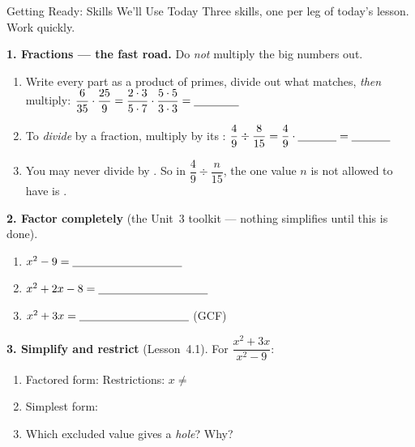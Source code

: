 \documentclass[10pt]{article}
\begin{document}
\namedateperiod

\vspace{0.10in}

\begin{notesbox}{Getting Ready: Skills We'll Use Today}
\small Three skills, one per leg of today's lesson. Work quickly.

\vspace{4pt}
\textbf{1. Fractions --- the fast road.} Do \emph{not} multiply the big numbers out.
\begin{enumerate}[label=(\alph*), leftmargin=2.1em, itemsep=3pt]
  \item Write every part as a product of primes, divide out what matches, \emph{then} multiply:
        $\dfrac{6}{35}\cdot\dfrac{25}{9}=\dfrac{2\cdot3}{5\cdot7}\cdot\dfrac{5\cdot5}{3\cdot3}
        =\blank{1.4cm}$
  \item To \emph{divide} by a fraction, multiply by its \blank{2.4cm}:
        $\dfrac{4}{9}\div\dfrac{8}{15}=\dfrac{4}{9}\cdot\blank{1.2cm}=\blank{1.2cm}$
  \item You may never divide by \blank{1.2cm}. So in $\dfrac{4}{9}\div\dfrac{n}{15}$, the one value
        $n$ is not allowed to have is \blank{1.0cm}.
\end{enumerate}

\vspace{4pt}
\textbf{2. Factor completely} (the Unit~3 toolkit --- nothing simplifies until this is done).
\begin{enumerate}[label=(\alph*), leftmargin=2.1em, itemsep=3pt]
  \item $x^2-9=\blank{3.4cm}$
  \item $x^2+2x-8=\blank{3.4cm}$
  \item $x^2+3x=\blank{3.4cm}$ \quad (GCF)
\end{enumerate}

\vspace{4pt}
\textbf{3. Simplify and restrict} (Lesson~4.1). For $\dfrac{x^2+3x}{x^2-9}$:
\begin{enumerate}[label=(\alph*), leftmargin=2.1em, itemsep=3pt]
  \item Factored form: \blank{4.0cm} \quad Restrictions: $x\neq$ \blank{1.8cm}
  \item Simplest form: \blank{2.2cm}
  \item Which excluded value gives a \emph{hole}? \blank{1.2cm} \; Why? \blank{4.4cm}
\end{enumerate}

\end{notesbox}
\end{document}
